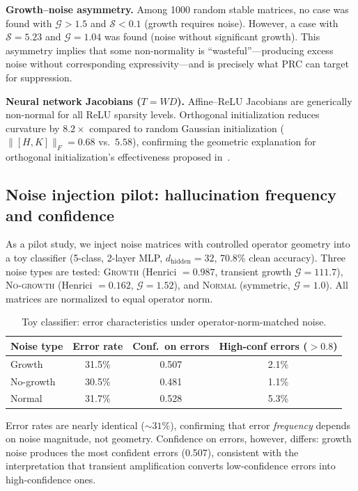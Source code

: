 \documentclass[11pt,a4paper]{article}
\theoremstyle{definition}
\begin{document}
\textbf{Growth--noise asymmetry.}
Among 1000 random stable matrices, no case was found with
$\mathcal{G} > 1.5$ and $\mathcal{S} < 0.1$ (growth requires noise).
However, a case with $\mathcal{S} = 5.23$ and $\mathcal{G} = 1.04$
was found (noise without significant growth). This asymmetry implies
that some non-normality is ``wasteful''---producing excess noise
without corresponding expressivity---and is precisely what PRC can
target for suppression.

\textbf{Neural network Jacobians ($T = WD$).}
Affine--ReLU Jacobians are generically non-normal for all ReLU
sparsity levels. Orthogonal initialization reduces curvature by
$8.2\times$ compared to random Gaussian initialization
($\|[H,K]\|_F = 0.68$ vs.\ $5.58$), confirming the geometric
explanation for orthogonal initialization's effectiveness
proposed in~\cite{cheng2025nnog}.

\subsection{Noise injection pilot: hallucination frequency and confidence}
\label{sec:hallucination}

As a pilot study, we inject noise matrices with controlled operator
geometry into a toy classifier (5-class, 2-layer MLP,
$d_{\mathrm{hidden}} = 32$, 70.8\% clean accuracy). Three noise types
are tested: \textsc{Growth} (Henrici $= 0.987$, transient growth
$\mathcal{G} = 111.7$), \textsc{No-growth} (Henrici $= 0.162$,
$\mathcal{G} = 1.52$), and \textsc{Normal} (symmetric,
$\mathcal{G} = 1.0$). All matrices are normalized to equal operator
norm.

\begin{table}[ht]
\centering
\caption{Toy classifier: error characteristics under operator-norm-matched noise.}
\label{tab:hallucination}
\begin{tabular}{@{}lccc@{}}
\toprule
Noise type & Error rate & Conf.\ on errors & High-conf errors ($>0.8$) \\
\midrule
Growth       & 31.5\% & 0.507 & 2.1\% \\
No-growth    & 30.5\% & 0.481 & 1.1\% \\
Normal       & 31.7\% & 0.528 & 5.3\% \\
\bottomrule
\end{tabular}
\end{table}

Error rates are nearly identical (${\sim}31\%$), confirming that
error \emph{frequency} depends on noise magnitude, not geometry.
Confidence on errors, however, differs: growth noise produces the
most confident errors (0.507), consistent with the interpretation
that transient amplification converts low-confidence errors into
high-confidence ones.
\end{document}
